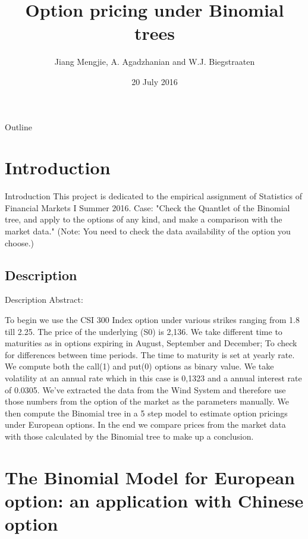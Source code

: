 \documentclass[unknownkeysallowed]{beamer}
\title[Binomial trees]{Option pricing under Binomial trees}
\author{Jiang Mengjie, A. Agadzhanian and W.J. Biegstraaten}
\institute{Project group 14 \\ SFM 2016}
\date{20 July 2016}
\begin{document}
\begin{frame}
  \titlepage
\end{frame}


\begin{frame}{Outline}
  \tableofcontents
\end{frame}

\section{Introduction}
\begin{frame}{Introduction}
 This project is dedicated to the empirical assignment of Statistics of Financial Markets I Summer 2016.
\linebreak
\linebreak
Case:
"Check the Quantlet of the Binomial tree, and apply to the options of any kind, and make a comparison with the market data." 
\linebreak
\linebreak
(Note: You need to check the data availability of the option you choose.)

\end{frame}

\subsection{Description}
\begin{frame}{Description}
Abstract:
\begin{block}{}
To begin we use the CSI 300 Index option under various strikes ranging from 1.8 till 2.25. The price of the underlying (S0) is 2,136.  We take different time to maturities as in options expiring in August, September and December; To check for differences between time periods. The time to maturity is set at yearly rate. We compute both the call(1) and put(0) options as binary value. We take volatility at an annual rate which in this case is 0,1323 and a annual interest rate of 0.0305. We've extracted the data from the Wind System and therefore use those numbers from the option of the market as the parameters manually. We then compute the Binomial tree in a 5 step model to estimate option pricings under European options. In the end we compare prices from the market data with those calculated by the Binomial tree to make up a conclusion.
\end{block}

\end{frame}

\section{The Binomial Model for European option: an application with Chinese option}
\end{document}
